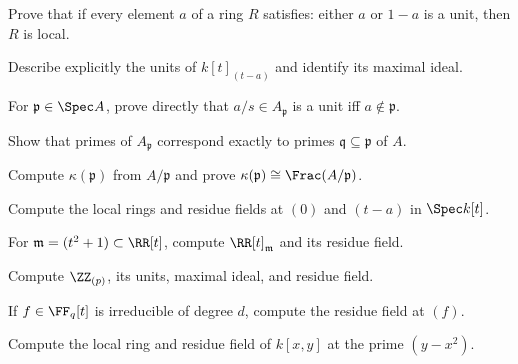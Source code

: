 \begin{exercise}
Prove that if every element $a$ of a ring $R$ satisfies: either $a$ or $1-a$ is a unit, then $R$ is local.
\end{exercise}

\begin{exercise}
Describe explicitly the units of $k[t]_{(t-a)}$ and identify its maximal ideal.
\end{exercise}

\begin{exercise}
For $\mathfrak p\in\Spec A$, prove directly that $a/s\in A_{\mathfrak p}$ is a unit iff $a\notin\mathfrak p$.
\end{exercise}

\begin{exercise}
Show that primes of $A_{\mathfrak p}$ correspond exactly to primes $\mathfrak q\subseteq\mathfrak p$ of $A$.
\end{exercise}

\begin{exercise}
Compute $\kappa(\mathfrak p)$ from $A/\mathfrak p$ and prove $\kappa(\mathfrak p)\cong\Frac(A/\mathfrak p)$.
\end{exercise}

\begin{exercise}
Compute the local rings and residue fields at $(0)$ and $(t-a)$ in $\Spec k[t]$.
\end{exercise}

\begin{exercise}
For $\mathfrak m=(t^2+1)\subset\RR[t]$, compute $\RR[t]_{\mathfrak m}$ and its residue field.
\end{exercise}

\begin{exercise}
Compute $\ZZ_{(p)}$, its units, maximal ideal, and residue field.
\end{exercise}

\begin{exercise}
If $f\in\FF_q[t]$ is irreducible of degree $d$, compute the residue field at $(f)$.
\end{exercise}

\begin{exercise}
Compute the local ring and residue field of $k[x,y]$ at the prime $(y-x^2)$.
\end{exercise}

